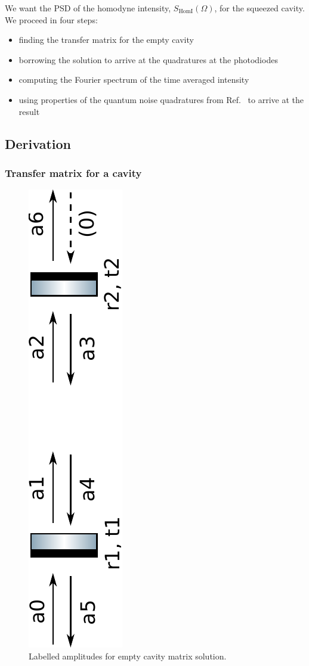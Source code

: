 \documentclass[aps,pra,superscriptaddress,reprint,nofootinbib]{revtex4-1}
\begin{document}
We want the PSD of the homodyne intensity, $S_{\mathrm{HomI}}(\Omega)$, for the squeezed cavity. We proceed in four steps:
\begin{itemize}
\item finding the transfer matrix for the empty cavity
\item borrowing the solution to arrive at the quadratures at the photodiodes
\item computing the Fourier spectrum of the time averaged intensity
\item using properties of the quantum noise quadratures from Ref.~\cite{Danilishin_2012} to arrive at the result
\end{itemize}

\subsection{Derivation}

\subsubsection{Transfer matrix for a cavity}

\begin{figure}
	\begin{center}
	\includegraphics[height=0.4\textwidth, angle=-90]{figures/empty_cavity_amplitudes.pdf}
	\end{center}
	\caption{Labelled amplitudes for empty cavity matrix solution.}
	\label{fig:empty_cavity_amplitudes}
\end{figure}
\end{document}
